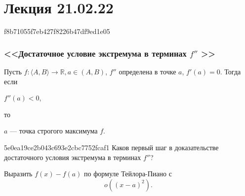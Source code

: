 \section{Лекция 21.02.22}

\begin{note}{f8b71055f7eb427f8226b47df9ed1e05}
    \subsubsection{<<Достаточное условие экстремума в терминах \( f'' \) >>}
    Пусть \( f : \langle A, B \rangle \to \mathbb R, a \in (A, B) \), \( f'' \) определена в точке \( a \), \( f'(a) = 0 \).
    Тогда если \begin{icloze}{1}\( f''(a) < 0 \),\end{icloze} то \begin{icloze}{2}\( a \) --- точка строгого максимума \( f \).\end{icloze}
\end{note}

\begin{note}{5e0ea19ce2b043c693e2cbc7752fcaf1}
    Каков первый шаг в доказательстве достаточного условия экстремума в терминах \( f'' \)?

    \begin{cloze}{1}
        Выразить \( f(x) - f(a) \)  по формуле Тейлора-Пиано с
        \[
            o((x - a)^2 ).
        \]
    \end{cloze}
\end{note}

